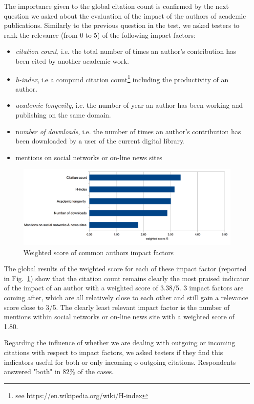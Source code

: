 \documentclass[runningheads,a4paper]{llncs}
\makeatletter
\def\maxwidth#1{\ifdim\Gin@nat@width>#1 #1\else\Gin@nat@width\fi}
\makeatother
\begin{document}
The importance given to the global citation count is confirmed by the next question we asked about the evaluation of the impact of the authors of academic publications. Similarly to the previous question in the test, we asked testers to rank the relevance (from 0 to 5) of the following impact factors:
\begin{itemize}
\item {\em citation count}, i.e. the total number of times an author's contribution has been cited by another academic work.
\item {\em h-index}, i.e a compund citation count\footnote{see https://en.wikipedia.org/wiki/H-index} including the productivity of an author.
\item {\em academic longevity}, i.e. the number of year an author has been working and publishing on the same domain.
\item n{\em umber of downloads}, i.e. the number of times an author's contribution has been downloaded by a user of the current digital library.
\item mentions on social networks or on-line news sites
\end{itemize}
\begin{figure}[h!]
\centering
\includegraphics[width=\maxwidth{\textwidth}]{img/100002010000048F000001AD0C5FF7A68119D843.png}
\cprotect\caption{Weighted score of common authors impact factors}
\label{refFigure1}
\end{figure}


The global results of the weighted score for each of these impact factor (reported in Fig.~\ref{refFigure1}) show that the citation count remains clearly the most praised indicator of the impact of an author with a weighted score of 3.38/5. 3 impact factors are coming after, which are all relatively close to each other and still gain a relevance score close to 3/5. The clearly least relevant impact factor is the number of mentions within social networks or on-line news site with a weighted score of 1.80.

Regarding the influence of whether we are dealing with outgoing or incoming citations with respect to impact factors, we asked testers if they find this indicators useful for both or only incoming o outgoing citations. Respondents answered "both" in 82\% of the cases.
\end{document}

